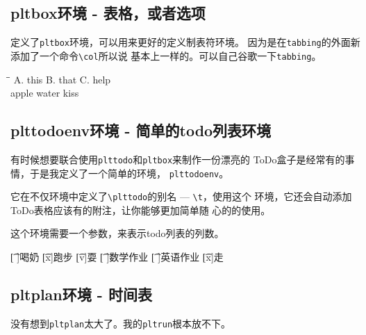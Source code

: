 \documentclass{../src/peterlitsdoc}
\newcommand{\vb}{\verb}
\begin{document}

\subsection{pltbox环境 - 表格，或者选项}

定义了\vb|pltbox|环境，可以用来更好的定义制表符环境。
因为是在\vb|tabbing|的外面新添加了一个命令\vb|\col|所以说
基本上一样的。可以自己谷歌一下\vb|tabbing|。

\begin{pltrun}
\begin{pltbox}
\=\=\kill
A. this   \>B. that   \>C. help   \\
\plttodo[ ]apple                  \>
\plttodo[x]water                  \>
\plttodo[ ]kiss                   \\
\end{pltbox}
\end{pltrun}



\subsection{plttodoenv环境 - 简单的todo列表环境}

有时候想要联合使用\vb|plttodo|和\vb|pltbox|来制作一份漂亮的
ToDo盒子是经常有的事情，于是我定义了一个简单的环境，
\vb|plttodoenv|。

它在不仅环境中定义了\vb|\plttodo|的别名 --- \vb|\t|，使用这个
环境，它还会自动添加ToDo表格应该有的附注，让你能够更加简单随
心的的使用。

这个环境需要一个参数，来表示todo列表的列数。

\begin{pltrun}
\begin{plttodoenv}{2}
\t[ ]喝奶     \t[x]跑步     \t[v]耍
\t[ ]数学作业 \t[ ]英语作业 \t[x]走
\end{plttodoenv}
\end{pltrun}



\subsection{pltplan环境 - 时间表}

没有想到\vb|pltplan|太大了。我的\vb|pltrun|根本放不下。
\end{document}
